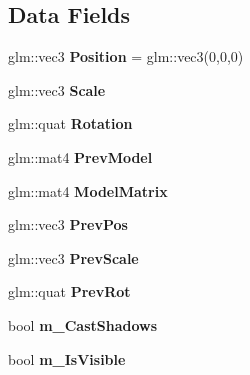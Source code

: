 \subsection*{Data Fields}
\begin{DoxyCompactItemize}
\item 
glm\+::vec3 {\bfseries Position} = glm\+::vec3(0,0,0)\hypertarget{class_model_a973bfbdb62d7cc49da681f5f96416bac}{}\label{class_model_a973bfbdb62d7cc49da681f5f96416bac}

\item 
glm\+::vec3 {\bfseries Scale}\hypertarget{class_model_a272a95591f623982748ca26cfc2787b3}{}\label{class_model_a272a95591f623982748ca26cfc2787b3}

\item 
glm\+::quat {\bfseries Rotation}\hypertarget{class_model_ae319973305e370f31f131b6bc53c71ca}{}\label{class_model_ae319973305e370f31f131b6bc53c71ca}

\item 
glm\+::mat4 {\bfseries Prev\+Model}\hypertarget{class_model_ad76b2b52fe00a1f4940b8160ff445226}{}\label{class_model_ad76b2b52fe00a1f4940b8160ff445226}

\item 
glm\+::mat4 {\bfseries Model\+Matrix}\hypertarget{class_model_af7253432a4b7c2a1f3e884be5b992419}{}\label{class_model_af7253432a4b7c2a1f3e884be5b992419}

\item 
glm\+::vec3 {\bfseries Prev\+Pos}\hypertarget{class_model_a7529ea1a44280e90349ad0c82ba43324}{}\label{class_model_a7529ea1a44280e90349ad0c82ba43324}

\item 
glm\+::vec3 {\bfseries Prev\+Scale}\hypertarget{class_model_a62b4358f4aed04a2ad19baca834650f6}{}\label{class_model_a62b4358f4aed04a2ad19baca834650f6}

\item 
glm\+::quat {\bfseries Prev\+Rot}\hypertarget{class_model_a3db8a33c371e5572d169a0b032b4178b}{}\label{class_model_a3db8a33c371e5572d169a0b032b4178b}

\item 
bool {\bfseries m\+\_\+\+Cast\+Shadows}\hypertarget{class_model_a8fae239ce9a064b20070c5a50f3c15a9}{}\label{class_model_a8fae239ce9a064b20070c5a50f3c15a9}

\item 
bool {\bfseries m\+\_\+\+Is\+Visible}\hypertarget{class_model_a2be5d1b1db5c70b22ff1f43e45146e09}{}\label{class_model_a2be5d1b1db5c70b22ff1f43e45146e09}


\end{DoxyCompactItemize}
